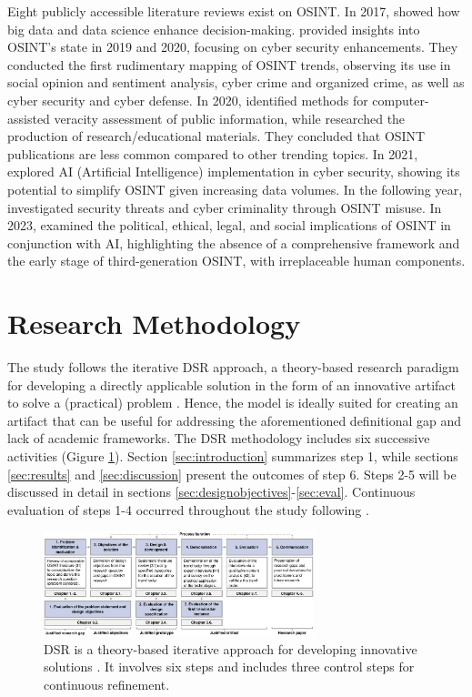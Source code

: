 \documentclass[10pt]{article}
\begin{document}
Eight publicly accessible literature reviews exist on OSINT. In 2017, \cite{DosPassos.2017} showed how big data and data science enhance decision-making. \cite{PastorGalindo.2019, PastorGalindo.2020}
provided insights into OSINT's state in 2019 and 2020, focusing on cyber security
enhancements. They conducted the first rudimentary mapping of OSINT trends, observing its use in social opinion and sentiment
analysis, cyber crime and organized crime, as well as cyber security and cyber defense. In 2020, \cite{GarciaLozano.2020} identified methods for computer-assisted veracity assessment of public information, while
\cite{HerreraCubides.2020} researched the production of research/educational materials. They concluded that OSINT
publications are less common compared to other trending topics. In 2021, \cite{Yogish.2021} explored AI (Artificial Intelligence) implementation in cyber security,
showing its potential to simplify OSINT given increasing data volumes. In the following year,
\cite{Hwang.2022} investigated security threats and cyber criminality through OSINT misuse.
In 2023, \cite{Ghioni.2023} examined the political, ethical, legal, and social implications of
OSINT in conjunction with AI, highlighting the absence of a comprehensive framework and the early stage of third-generation OSINT, with irreplaceable human components.

\section{Research Methodology}

The study follows the iterative DSR approach, a theory-based research paradigm for developing a directly applicable solution in the form of an innovative artifact \cite{vomBrocke.2020b}
to solve a (practical) problem \cite{Peffers.2007}. Hence, the model is ideally suited for creating an artifact that can be useful for addressing the aforementioned definitional gap and lack of academic frameworks. The DSR methodology includes
six successive activities \cite{Peffers.2007} (Gigure \ref{fig: DSRM}). Section \ref{sec:introduction} summarizes step 1, while sections \ref{sec:results} and \ref{sec:discussion} present the outcomes of step 6. Steps 2-5 will be discussed in detail in sections \ref{sec:designobjectives}-\ref{sec:eval}. Continuous evaluation of steps 1-4 occurred throughout the study following \cite{Sonnenberg.2012}.

\begin{figure}[thb]
    \centering
    \includegraphics[width=0.7\textwidth]{PDF/images/cropped DSR_V01.pdf}
    \caption{DSR is a theory-based iterative approach for developing innovative solutions \cite{Peffers.2007}. It involves six steps \cite{Peffers.2007} and includes three control steps \cite{Sonnenberg.2012} for continuous refinement.}
    \label{fig: DSRM}
\end{figure}
\end{document}
